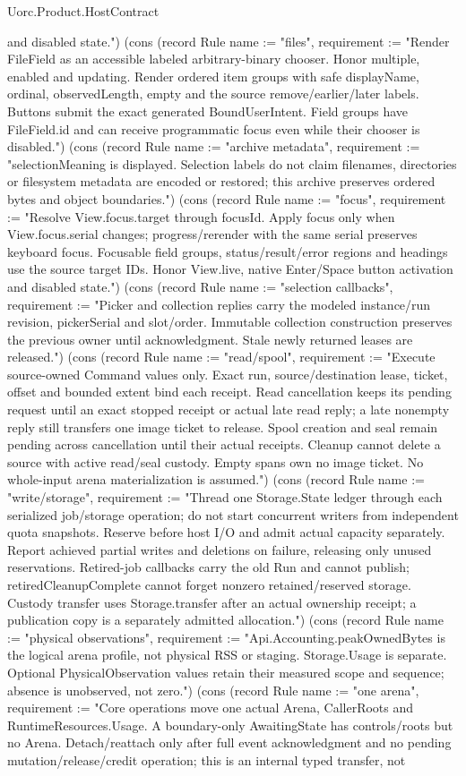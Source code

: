 \begin{lexlean}{Uorc.Product.HostContract}
\begin{semanticmodule}
{and disabled state."}) (cons (record Rule {name := "files", requirement := "Render FileField as an accessible labeled arbitrary-binary chooser. Honor multiple, enabled and updating. Render ordered item groups with safe displayName, ordinal, observedLength, empty and the source remove/earlier/later labels. Buttons submit the exact generated BoundUserIntent. Field groups have FileField.id and can receive programmatic focus even while their chooser is disabled."}) (cons (record Rule {name := "archive metadata", requirement := "selectionMeaning is displayed. Selection labels do not claim filenames, directories or filesystem metadata are encoded or restored; this archive preserves ordered bytes and object boundaries."}) (cons (record Rule {name := "focus", requirement := "Resolve View.focus.target through focusId. Apply focus only when View.focus.serial changes; progress/rerender with the same serial preserves keyboard focus. Focusable field groups, status/result/error regions and headings use the source target IDs. Honor View.live, native Enter/Space button activation and disabled state."}) (cons (record Rule {name := "selection callbacks", requirement := "Picker and collection replies carry the modeled instance/run revision, pickerSerial and slot/order. Immutable collection construction preserves the previous owner until acknowledgment. Stale newly returned leases are released."}) (cons (record Rule {name := "read/spool", requirement := "Execute source-owned Command values only. Exact run, source/destination lease, ticket, offset and bounded extent bind each receipt. Read cancellation keeps its pending request until an exact stopped receipt or actual late read reply; a late nonempty reply still transfers one image ticket to release. Spool creation and seal remain pending across cancellation until their actual receipts. Cleanup cannot delete a source with active read/seal custody. Empty spans own no image ticket. No whole-input arena materialization is assumed."}) (cons (record Rule {name := "write/storage", requirement := "Thread one Storage.State ledger through each serialized job/storage operation; do not start concurrent writers from independent quota snapshots. Reserve before host I/O and admit actual capacity separately. Report achieved partial writes and deletions on failure, releasing only unused reservations. Retired-job callbacks carry the old Run and cannot publish; retiredCleanupComplete cannot forget nonzero retained/reserved storage. Custody transfer uses Storage.transfer after an actual ownership receipt; a publication copy is a separately admitted allocation."}) (cons (record Rule {name := "physical observations", requirement := "Api.Accounting.peakOwnedBytes is the logical arena profile, not physical RSS or staging. Storage.Usage is separate. Optional PhysicalObservation values retain their measured scope and sequence; absence is unobserved, not zero."}) (cons (record Rule {name := "one arena", requirement := "Core operations move one actual Arena, CallerRoots and RuntimeResources.Usage. A boundary-only AwaitingState has controls/roots but no Arena. Detach/reattach only after full event acknowledgment and no pending mutation/release/credit operation; this is an internal typed transfer, not }
\end{semanticmodule}
\end{lexlean}
